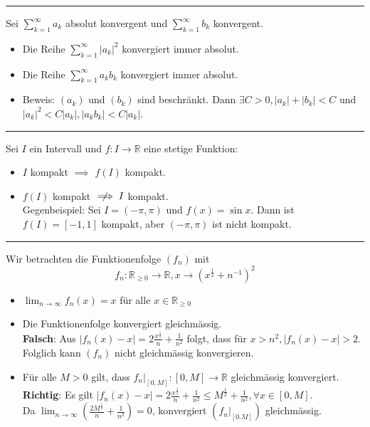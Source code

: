 \documentclass[a4paper,fontsize = 7pt]{scrartcl}
\def\limn{\lim_{n\to \infty}}
\def\sumk{\sum_{k=1}^\infty}
\def\R{\mathbb{R}}
\begin{document}
\vspace{0.1 cm}
\hrule
\vspace{0.2 cm}

Sei $\sumk a_k$ absolut konvergent und $\sumk b_k$ konvergent.
\begin{itemize}
  \item Die Reihe $\sumk |a_k|^2$ konvergiert immer absolut.
  \item Die Reihe $\sumk a_kb_k$ konvergiert immer absolut.
  \item Beweis: $(a_k)$ und $(b_k)$ sind beschränkt. Dann $\exists C > 0, |a_k| + |b_k| < C$ und 
  \\$|a_k|^2 < C|a_k|, |a_kb_k| < C|a_k|$.
\end{itemize}

\vspace{0.1 cm}
\hrule
\vspace{0.2 cm}

Sei $I$ ein Intervall und $f: I \to \R$ eine stetige Funktion:
\begin{itemize}
  \item $I$ kompakt $\implies$ $f(I)$ kompakt.
  \item $f(I)$ kompakt $\centernot \implies I$ kompakt.
  \\ Gegenbeispiel: Sei $I = (-\pi, \pi)$ und $f(x)= \sin x$. Dann ist $f(I) = [-1, 1]$ kompakt, aber $(-\pi,\pi)$ ist nicht kompakt.  
\end{itemize}

\vspace{0.1 cm}
\hrule
\vspace{0.2 cm}

Wir betrachten die Funktionenfolge $(f_n)$ mit 
$$f_n: \R_{\geq 0} \to \R, x \to (x^{\frac{1}{2}}+n^{-1})^2$$
\begin{itemize}
  \item $\limn f_n(x) = x$ für alle $x \in \R_{\geq 0}$
  \item Die Funktionenfolge konvergiert gleichmässig.
  \\ \textbf{Falsch}: Aus $|f_n(x) - x| = 2\frac{x^{\frac{1}{2}}}{n} + \frac{1}{n^2}$ folgt, dass für $x > n^2, |f_n(x) - x| > 2$. Folglich kann $(f_n)$ nicht gleichmässig konvergieren.
  \item Für alle $M > 0$ gilt, dass $f_n|_{[0, M]}: [0,M] \to \R$ gleichmässig konvergiert.
  \\ \textbf{Richtig}: Es gilt $|f_n(x) - x| = 2\frac{x^{\frac{1}{2}}}{n} + \frac{1}{n^2} \leq M^{\frac{1}{2}} + \frac{1}{n^2}, \forall x \in [0,M]$.\\Da $\limn \left(\frac{2M^{\frac{1}{2}}}{n} + \frac{1}{n^2}\right) = 0$, konvergiert $(f_n|_{[0.M]})$ gleichmässig.  
\end{itemize}
\end{document}
